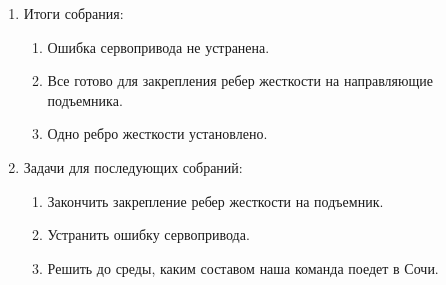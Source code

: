 \begin{enumerate}
\begin{enumerate}
    \end{enumerate}
    
	\item Итоги собрания: 
	\begin{enumerate}
	  \item Ошибка сервопривода не устранена.
	  
      \item Все готово для закрепления ребер жесткости на направляющие подъемника.
      
      \item Одно ребро жесткости установлено.
      
    \end{enumerate}
    
	\item Задачи для последующих собраний:
	\begin{enumerate}
	  \item Закончить закрепление ребер жесткости на подъемник.
	  
	  \item Устранить ошибку сервопривода.
	  
	  \item	Решить до среды, каким составом наша команда поедет в Сочи.
	  
    \end{enumerate}     
\end{enumerate}

\fillpage
